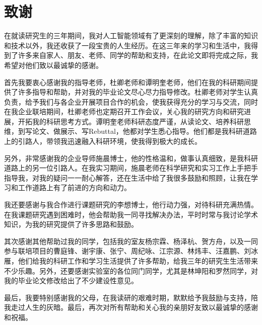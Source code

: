 \chapter{致\texorpdfstring{\quad}{}谢}

在就读研究生的三年期间，我对人工智能领域有了更深刻的理解，除了丰富的知识和技术以外，我还收获了一段宝贵的人生经历。在这三年来的学习和生活中，我得到了许多来自家人、朋友、老师、同学的帮助和支持，在此论文即将完成之际，我希望对他们致以最诚挚的感谢。

首先我要衷心感谢我的指导老师，杜卿老师和谭明奎老师，他们在我的科研期间提供了许多指导和帮助，并对我的毕业论文尽心尽力指导修改。杜卿老师对学生认真负责，给予我们与各企业开展项目合作的机会，使我获得充分的学习与交流，同时在我企业联培期间，杜卿老师也定期召开工作会议，关心我的研究方向和研究进展，开拓我的科研思考方式。谭明奎老师科研态度严谨，从读论文、培养科研思维，到写论文、做展示、写Rebuttal，他都对学生悉心指导。他们都是我科研道路上的引路人，带领我迅速融入科研环境，使我得到极大的成长。

另外，非常感谢我的企业导师施晨博士，他的性格温和，做事认真细致，是我科研道路上的另一位引路人。在我实习期间，施晨老师在科学研究和实习工作上手把手指导我，对我的疑问一一耐心解答，还在生活中给了我很多鼓励和照顾，让我在学习和工作道路上有了前进的方向和动力。

我还要感谢与我合作进行课题研究的李想博士，他行动力强，对待科研充满热情。在我课题研究遇到困难时，他会帮助我一同寻找解决办法，平时时常与我讨论学术知识，为我的研究提供了许多思路和鼓励。

其次感谢其他帮助过我的同学，包括我的室友杨宗霖、杨泽杭、贺方舟，以及一同参与联培项目的曹庭锋、谢宇康、张宁、周纪咏、江宗源、林炜丰、汪嘉鹏、刘冰雁，他们给我的科研工作和学习生活提供了许多帮助，给我三年的研究生生活带来不少乐趣。另外，还要感谢实验室的各位同门同学，尤其是林坤阳和罗然同学，对我的毕业论文修改给出了不少建设性意见。

最后，我要特别感谢我的父母，在我读研的艰难时期，默默给予我鼓励与支持，陪我走过人生的灰暗。最后，再次对所有帮助和关心我的亲朋好友致以最诚挚的感谢和祝福。


